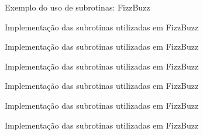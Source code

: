 \begin{frame}[fragile]{Exemplo do uso de subrotinas: FizzBuzz}
\end{frame}

\begin{frame}[fragile]{Implementação das subrotinas utilizadas em FizzBuzz}
\end{frame}

\begin{frame}[fragile]{Implementação das subrotinas utilizadas em FizzBuzz}
\end{frame}

\begin{frame}[fragile]{Implementação das subrotinas utilizadas em FizzBuzz}
\end{frame}

\begin{frame}[fragile]{Implementação das subrotinas utilizadas em FizzBuzz}
\end{frame}

\begin{frame}[fragile]{Implementação das subrotinas utilizadas em FizzBuzz}
\end{frame}

\begin{frame}[fragile]{Implementação das subrotinas utilizadas em FizzBuzz}
\end{frame}
